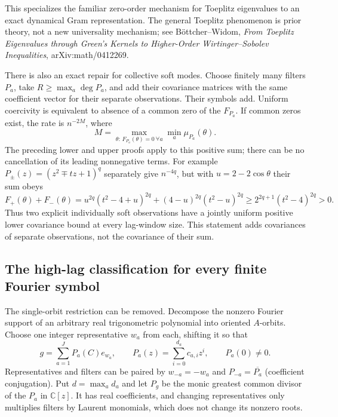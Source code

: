 This specializes the familiar zero-order mechanism for Toeplitz eigenvalues
to an exact dynamical Gram representation. The general Toeplitz phenomenon
is prior theory, not a new universality mechanism; see B\"ottcher--Widom,
\emph{From Toeplitz Eigenvalues through Green's Kernels to Higher-Order
Wirtinger--Sobolev Inequalities}, arXiv:math/0412269.

There is also an exact repair for collective soft modes. Choose finitely many
filters $P_a$, take $R\ge\max_a\deg P_a$, and add their covariance matrices with the same
coefficient vector for their separate observations. Their symbols add.
Uniform coercivity is equivalent to absence of a common zero of the $F_{P_a}$.
If common zeros exist, the rate is $n^{-2M}$, where
\[
 M=\max_{\theta:\,F_{P_a}(\theta)=0\ \forall a}
                  \min_a\mu_{P_a}(\theta).
\]
The preceding lower and upper proofs apply to this positive sum; there can be
no cancellation of its leading nonnegative terms.
For example $P_\pm(z)=(z^2\mp tz+1)^q$ separately give $n^{-4q}$, but with
$u=2-2\cos\theta$ their sum obeys
\[
 F_+(\theta)+F_-(\theta)
 =u^{2q}(t^2-4+u)^{2q}
 +(4-u)^{2q}(t^2-u)^{2q}
 \ge 2^{2q+1}(t^2-4)^{2q}>0.
\]
Thus two explicit individually soft observations have a jointly uniform
positive lower covariance bound at every lag-window size. This statement
adds covariances of separate observations, not the covariance of their sum.

\subsection{The high-lag classification for every finite Fourier symbol}
The single-orbit restriction can be removed. Decompose the nonzero Fourier
support of an arbitrary real trigonometric polynomial into oriented $A$-orbits.
Choose one integer representative $w_a$ from each, shifting it so that
\[
 g=\sum_{a=1}^J P_a(C)e_{w_a},\qquad
 P_a(z)=\sum_{i=0}^{d_a}c_{a,i}z^i,\qquad P_a(0)\ne0.
\]
Representatives and filters can be paired by $w_{-a}=-w_a$ and
$P_{-a}=\overline{P_a}$ (coefficient conjugation). Put $d=\max_a d_a$ and
let $P_g$ be the monic greatest common divisor of the $P_a$ in $\mathbb C[z]$.
It has real coefficients, and changing representatives only multiplies filters
by Laurent monomials, which does not change its nonzero roots.

